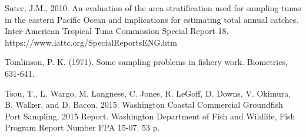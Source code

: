 \documentclass[12pt]{article}
\begin{document}
\begin{thebibliography}{1}
%
 Suter, J.M., 2010. An evaluation of the area 
stratification used for sampling tunas in the eastern Pacific Ocean and 
implications for estimating total annual catches. Inter-American Tropical Tuna 
Commission Special Report 18. https://www.iattc.org/SpecialReportsENG.htm

%
 Tomlinson, P. K. (1971). Some sampling problems in 
fishery work. Biometrics, 631-641.

%
 Tsou, T., L. Wargo, M. Langness, C. Jones, R. LeGoff, D. 
Downs, V. Okimura, B. Walker, and D. Bacon. 2015. Washington Coastal 
Commercial Groundfish Port Sampling, 2015 Report. Washington Department of 
Fish and Wildlife, Fish Program Report Number FPA 15-07. 53 p.

\end{thebibliography}

%
\end{document}
